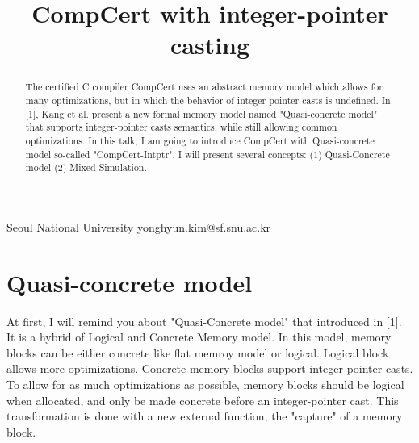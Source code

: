 \documentclass[nocopyrightspace]{sigplanconf}
\begin{document}
\setlength{\pdfpageheight}{\paperheight}
\setlength{\pdfpagewidth}{\paperwidth}






\title{CompCert with integer-pointer casting}
\subtitle{}

           {Seoul National University}
           {yonghyun.kim@sf.snu.ac.kr}

\maketitle

\begin{abstract}
The certified C compiler CompCert uses an abstract memory model which allows for many optimizations, but in which the behavior of integer-pointer casts is undefined. In [1], Kang et al. present a new formal memory model named "Quasi-concrete model" that supports integer-pointer casts semantics, while still allowing common optimizations. In this talk, I am going to introduce CompCert with Quasi-concrete model so-called "CompCert-Intptr". I will present several concepts: (1) Quasi-Concrete model (2) Mixed Simulation.
\end{abstract}

\section{Quasi-concrete model}
At first, I will remind you about "Quasi-Concrete model" that introduced in [1]. It is a hybrid of Logical and Concrete Memory model. In this model, memory blocks can be either concrete like flat memroy model or logical. Logical block allows more optimizations. Concrete memory blocks support integer-pointer casts. To allow for as much optimizations as possible, memory blocks should be logical when allocated, and only be made concrete before an integer-pointer cast. This transformation is done with a new external function, the "capture" of a memory block.
\end{document}
